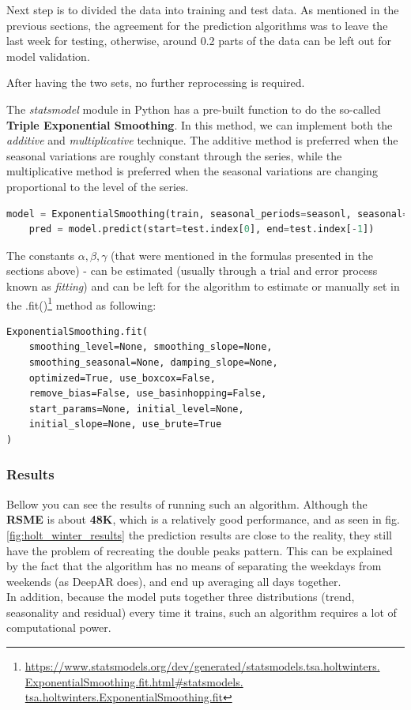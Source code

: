 Next step is to divided the data into training and test data. As mentioned in the previous sections, the agreement for the prediction algorithms was to leave the last week for testing, otherwise, around 0.2 parts of the data can be left out for model validation.

After having the two sets, no further reprocessing is required.

The \textit{statsmodel} module in Python has a pre-built function to do the so-called \textbf{Triple Exponential Smoothing}. In this method, we can implement both the \textit{additive} and \textit{multiplicative} technique. The additive method is preferred when the seasonal variations are roughly constant through the series, while the multiplicative method is preferred when the seasonal variations are changing proportional to the level of the series.
\begin{lstlisting}[language=Python, caption=Exponential Smoothing method]
    model = ExponentialSmoothing(train, seasonal_periods=seasonl, seasonal='mul').fit()
    pred = model.predict(start=test.index[0], end=test.index[-1])
\end{lstlisting}

The constants \textbf{$\alpha, \beta, \gamma$} (that were mentioned in the formulas presented in the sections above) - can be estimated (usually through a trial and error process known as \textit{fitting}) and can be left for the algorithm to estimate or manually set in the .fit()\footnote{\url{https://www.statsmodels.org/dev/generated/statsmodels.tsa.holtwinters. ExponentialSmoothing.fit.html#statsmodels. tsa.holtwinters.ExponentialSmoothing.fit}} method as following:
\begin{lstlisting}
ExponentialSmoothing.fit(
    smoothing_level=None, smoothing_slope=None, 
    smoothing_seasonal=None, damping_slope=None, 
    optimized=True, use_boxcox=False, 
    remove_bias=False, use_basinhopping=False, 
    start_params=None, initial_level=None, 
    initial_slope=None, use_brute=True
)
\end{lstlisting}
\subsubsection{Results}

Bellow you can see the results of running such an algorithm. Although the \textbf{RSME} is about \textbf{48K}, which is a relatively good performance, and as seen in  fig. \ref{fig:holt_winter_results} the prediction results are close to the reality, they still have the problem of recreating the double peaks pattern. This can be explained by the fact that the algorithm has no means of separating the weekdays from weekends (as DeepAR does), and end up averaging all days together. \\
In addition, because the model puts together three distributions (trend, seasonality and residual) every time it trains, such an algorithm requires a lot of computational power.\\

